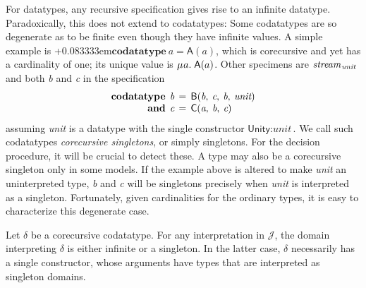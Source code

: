 \documentclass[smallcondensed,draft]{svjour3}
\newcommand\MU{\vvthinspace\mu\vvthinspace}
\newcommand\afterDot{\;} %
\newcommand\keyw[1]{\textbf{#1}}
\newcommand\const[1]{\textsf{#1}}
\newcommand\ty[1]{\textit{#1}}
\newcommand{\JJJJ}{\mathcal{\!J\!}}
\newcommand\vvthinspace{\kern+0.041667em}
\newcommand\vthinspace{\kern+0.083333em}
\begin{document}



For datatypes, any recursive specification gives rise to an infinite datatype.
Paradoxically, this does not extend to codatatypes:
Some codatatypes are so degenerate as to be finite even though they
have infinite values. A simple example is
\vthinspace$\keyw{codatatype}~\ty{a} = \const{A}(\ty{a})$, which is corecursive
and yet has a cardinality of one;
its unique value is $\MU a.\; \const{A}(a)$. Other specimens are
$\ty{stream}_{\vthinspace\ty{unit}\,}$
and both \ty{b} and \ty{c} in the specification
\[\begin{aligned}[t]
      \keyw{codatatype}\;\, \ty{b} & \,=\, \const{B}(\ty{b},\: \ty{c},\: \ty{b},\: \ty{unit}) \\[-1\jot]
      \keyw{and}\;\, \ty{c} & \,=\, \const{C}(\ty{a},\: \ty{b},\: \ty{c})
\end{aligned}
\]
assuming \ty{unit} is a datatype with the single constructor $\const{Unity} :
\ty{unit}$. We call such codatatypes
\emph{corecursive singletons}, or simply singletons.
For the decision procedure, it will be
crucial to detect these. %
A type may also be a corecursive singleton only in some models. If the example
above is altered to make \ty{unit} an uninterpreted type, \ty{b} and \ty{c} will be
singletons precisely when \ty{unit} is interpreted as a singleton.
Fortunately, given cardinalities for the ordinary types,
it is easy to characterize this degenerate case.


\begin{lemma}%
\label{lem:corecursive-singletons}%
\afterDot
Let $\delta$ be a corecursive codatatype. For any interpretation in $\JJJJ$,
the domain interpreting $\delta$ is either infinite or a singleton. In the
latter case, $\delta$ necessarily has a single constructor, whose arguments have
types that are interpreted as singleton domains.
\end{lemma}
\end{document}
